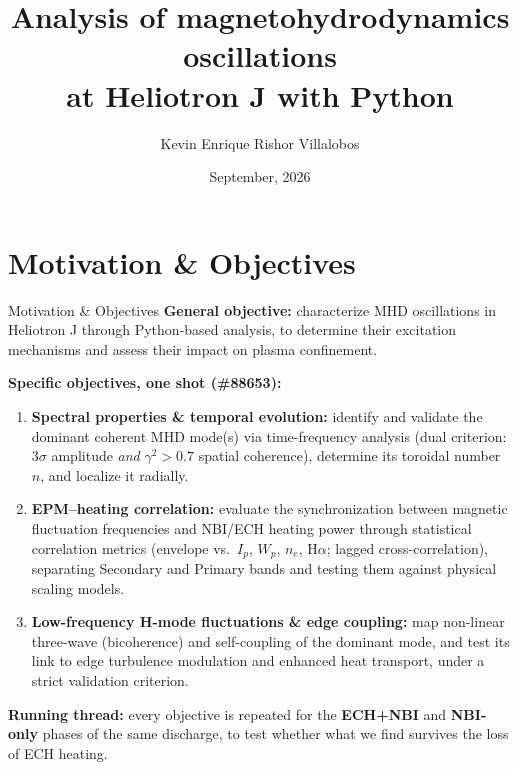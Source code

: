 \documentclass[aspectratio=169]{beamer}
\title[MHD Oscillations at Heliotron J]{Analysis of magnetohydrodynamics oscillations \\ at Heliotron J with Python}
\author[K. Rishor Villalobos]{Kevin Enrique Rishor Villalobos}
\institute[TEC \& IAE Kyoto]{
    Physics School, Tecnológico de Costa Rica (TEC) \\
    \vspace{0.2cm}
    Institute of Advanced Energy, Kyoto University
}
\date{September, 2026}
\begin{document}
\begin{frame}
    \titlepage
\end{frame}

\section{Motivation \& Objectives}

\begin{frame}{Motivation \& Objectives}
    \footnotesize
    \textbf{General objective:} characterize MHD oscillations in Heliotron J through
    Python-based analysis, to determine their excitation mechanisms and assess their
    impact on plasma confinement.

    \vspace{0.15cm}
    \textbf{Specific objectives, one shot (\#88653):}
    \begin{enumerate}
        \item \textbf{Spectral properties \& temporal evolution:} identify and validate
        the dominant coherent MHD mode(s) via time-frequency analysis (dual criterion:
        $3\sigma$ amplitude \emph{and} $\gamma^2>0.7$ spatial coherence), determine its
        toroidal number $n$, and localize it radially.
        \item \textbf{EPM--heating correlation:} evaluate the synchronization between
        magnetic fluctuation frequencies and NBI/ECH heating power through statistical
        correlation metrics (envelope vs.\ $I_p$, $W_p$, $n_e$, H$\alpha$; lagged
        cross-correlation), separating Secondary and Primary bands and testing them against
        physical scaling models.
        \item \textbf{Low-frequency H-mode fluctuations \& edge coupling:} map
        non-linear three-wave (bicoherence) and self-coupling of the dominant mode,
        and test its link to edge turbulence modulation and enhanced heat transport,
        under a strict validation criterion.
    \end{enumerate}

    \vspace{0.15cm}
    \textbf{Running thread:} every objective is repeated for the
    \textbf{ECH+NBI} and \textbf{NBI-only} phases of the same discharge, to test
    whether what we find survives the loss of ECH heating.
\end{frame}
\end{document}

